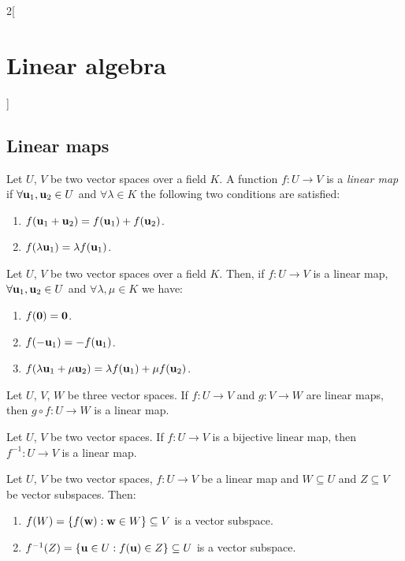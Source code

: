 \documentclass[../../../main_math.tex]{subfiles}
\begin{document}
\begin{multicols}{2}[\section{Linear algebra}]
  \subsection{Linear maps}
  \begin{definition}
    Let $U$, $V$ be two vector spaces over a field $K$. A function $f:U\rightarrow V$ is a \emph{linear map} if $\forall\boldsymbol{\mathrm{u}}_1,\boldsymbol{\mathrm{u}}_2\in U$ and $\forall\lambda\in K$ the following two conditions are satisfied:
    \begin{enumerate}
      \item $f(\boldsymbol{\mathrm{u}}_1+\boldsymbol{\mathrm{u}}_2)=f(\boldsymbol{\mathrm{u}}_1)+f(\boldsymbol{\mathrm{u}}_2)$.
      \item $f(\lambda \boldsymbol{\mathrm{u}}_1)=\lambda f(\boldsymbol{\mathrm{u}}_1)$.
    \end{enumerate}
  \end{definition}
  \begin{proposition}
    Let $U$, $V$ be two vector spaces over a field $K$. Then, if $f:U\rightarrow V$ is a linear map, $\forall\boldsymbol{\mathrm{u}}_1,\boldsymbol{\mathrm{u}}_2\in U$ and $\forall\lambda,\mu\in K$ we have:
    \begin{enumerate}
      \item $f(\boldsymbol{\mathrm{0}})=\boldsymbol{\mathrm{0}}$.
      \item $f(-\boldsymbol{\mathrm{u}}_1)=-f(\boldsymbol{\mathrm{u}}_1)$.
      \item $f(\lambda\boldsymbol{\mathrm{u}}_1+\mu\boldsymbol{\mathrm{u}}_2)=\lambda f(\boldsymbol{\mathrm{u}}_1)+\mu f(\boldsymbol{\mathrm{u}}_2)$.
    \end{enumerate}
  \end{proposition}
  \begin{proposition}
    Let $U$, $V$, $W$ be three vector spaces. If $f:U\rightarrow V$ and $g:V\rightarrow W$ are linear maps, then $g\circ f:U\rightarrow W$ is a linear map.
  \end{proposition}
  \begin{proposition}
    Let $U$, $V$ be two vector spaces. If $f:U\rightarrow V$ is a bijective linear map, then $f^{-1}:U\rightarrow V$ is a linear map.
  \end{proposition}
  \begin{proposition}
    Let $U$, $V$ be two vector spaces, $f:U\rightarrow V$ be a linear map and $W\subseteq U$ and $Z\subseteq V$ be vector subspaces. Then:
    \begin{enumerate}
      \item $f(W)=\{f(\boldsymbol{\mathrm{w}}): \boldsymbol{\mathrm{w}}\in W\}\subseteq V$ is a vector subspace.
      \item $f^{-1}(Z)=\{\boldsymbol{\mathrm{u}}\in U: f(\boldsymbol{\mathrm{u}})\in Z\}\subseteq U$ is a vector subspace.
    \end{enumerate}

\end{proposition}
\end{multicols}
\end{document}
